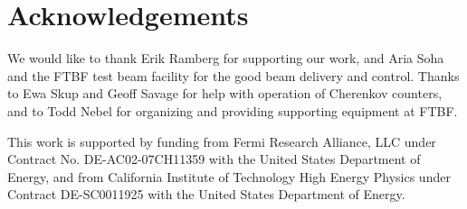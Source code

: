 \documentclass[12pt]{article}
\begin{document}
\section{Acknowledgements} We would like to thank Erik Ramberg for supporting 
our work, and Aria Soha and the FTBF test beam facility for the good beam
delivery and control. Thanks to Ewa Skup and Geoff Savage for help with
operation of Cherenkov counters, and to Todd Nebel for organizing and providing
supporting equipment at FTBF. 

This work is supported by funding from Fermi Research Alliance, LLC under
Contract No. DE-AC02-07CH11359 with the United States Department of Energy, and
from California Institute of Technology High Energy Physics under Contract
DE-SC0011925 with the United States Department of Energy.

{}
 
\end{document}
